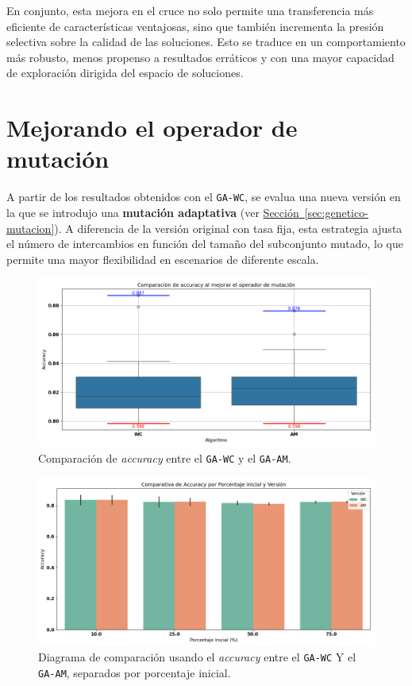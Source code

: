 En conjunto, esta mejora en el cruce no solo permite una transferencia más eficiente de características ventajosas,
sino que también incrementa la presión selectiva sobre la calidad de las soluciones.
Esto se traduce en un comportamiento más robusto, menos propenso a resultados erráticos y con una mayor capacidad de exploración dirigida del espacio de soluciones.


\section{Mejorando el operador de mutación}\label{sec:mejorando-mutacion}
A partir de los resultados obtenidos con el \texttt{GA-WC}, se evalua una nueva versión en la que se introdujo una \textbf{mutación adaptativa}
(ver \hyperref[sec:genetico-mutacion]{Sección~\ref*{sec:genetico-mutacion}}).
A diferencia de la versión original con tasa fija, esta estrategia ajusta el número de intercambios en función del tamaño del subconjunto mutado,
lo que permite una mayor flexibilidad en escenarios de diferente escala.

\begin{figure}[htp]
    \centering
    \includegraphics[width=1\textwidth]{imagenes/evaluaciones/mutacion-adaptativa.png}
    \caption{Comparación de \textit{accuracy} entre el \texttt{GA-WC} y el \texttt{GA-AM}.}
    \label{fig:mutacion-adaptativa}
\end{figure}

\begin{figure}[htp]
    \centering
    \includegraphics[width=1\textwidth]{imagenes/evaluaciones/mutacion-adaptativa_por_porcentaje.png}
    \caption{Diagrama de comparación usando el \textit{accuracy} entre el \texttt{GA-WC} Y el \texttt{GA-AM}, separados por porcentaje inicial.}
    \label{fig:mutacion-adaptativa-porcentaje}
\end{figure}


